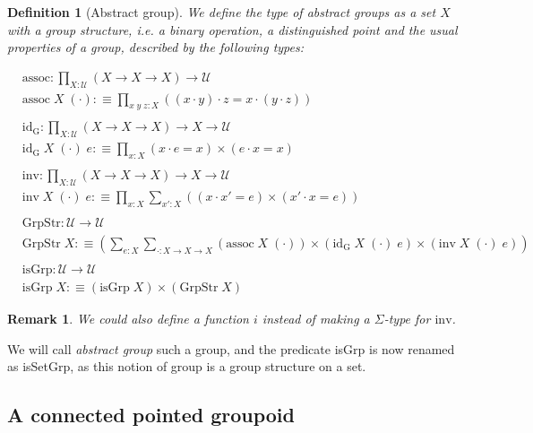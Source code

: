 \documentclass{article}
\newtheorem{defi}{Definition}
\newtheorem{rmk}{Remark}
\begin{document}
\begin{defi}[Abstract group]
    We define the type of abstract groups as a set $X$ with a group structure, i.e. a binary operation, a
    distinguished point and the usual properties of a group, described by the following types:
    
    \begin{align*}
        &\mathrm{assoc} : \prod_{X : \mathcal U} (X\to X \to X) \to \mathcal U\\
        &\mathrm{assoc}\;X\;(\cdot) :\equiv \prod_{x\;y\;z : X} ((x\cdot y)\cdot z = x\cdot (y\cdot z))\\ \\
        &\mathrm{id}_\mathrm G : \prod_{X : \mathcal U} (X \to X \to X) \to X \to \mathcal U\\
        &\mathrm{id}_\mathrm G\;X\;(\cdot)\;e :\equiv \prod_{x : X} (x\cdot e = x) \times (e \cdot x = x)\\ \\
        &\mathrm{inv} : \prod_{X : \mathcal U} (X \to X \to X) \to X \to \mathcal U\\
        &\mathrm{inv} \;X\;(\cdot)\;e :\equiv \prod_{x : X} \sum_{x' : X} ((x\cdot x' = e) \times (x'\cdot x 
        = e))\\
        \\
        &\mathrm{GrpStr} : \mathcal U \to \mathcal U\\
        &\mathrm{GrpStr}\;X :\equiv \left(\sum_{e : X} \sum_{\cdot : X \to X \to X} 
        (\mathrm{assoc}\;X\;(\cdot))\times (\mathrm{id}_\mathrm G \;X\;(\cdot)\;e)\times
        (\mathrm{inv}\;X\;(\cdot)\;e)\right)\\ \\
        &\mathrm{isGrp} : \mathcal U \to \mathcal U\\
        &\mathrm{isGrp}\;X :\equiv (\mathrm{isGrp}\;X)\times(\mathrm{GrpStr}\;X)
    \end{align*}
\end{defi}

\begin{rmk}
    We could also define a function $i$ instead of making a $\Sigma$-type for $\mathrm{inv}$.
\end{rmk}

We will call \textit{abstract group} such a group, and the predicate isGrp is now renamed as isSetGrp, as this
notion of group is a group structure on a set.

\subsection{A connected pointed groupoid}
\end{document}
